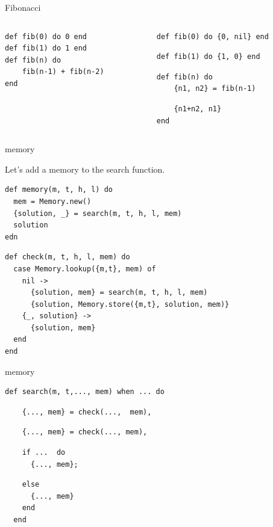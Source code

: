 \begin{frame}[fragile]{Fibonacci}

\begin{columns}
 \begin{column}{0.5\linewidth}
\begin{verbatim}
def fib(0) do 0 end
def fib(1) do 1 end
def fib(n) do
    fib(n-1) + fib(n-2)
end
\end{verbatim}
 \end {column}
\pause
 \begin{column}{0.5\linewidth}
\begin{verbatim}
def fib(0) do {0, nil} end
\end{verbatim}
\pause
\begin{verbatim}
def fib(1) do {1, 0} end
\end{verbatim}
\pause
\begin{verbatim}
def fib(n) do
    {n1, n2} = fib(n-1) 
\end{verbatim}
\pause
\begin{verbatim}
    {n1+n2, n1}
end
\end{verbatim}
 \end {column}
\end{columns}

\end{frame}

\begin{frame}[fragile]{memory}

Let's add a memory to the search function. 

\begin{verbatim}
def memory(m, t, h, l) do
  mem = Memory.new()
  {solution, _} = search(m, t, h, l, mem)
  solution
edn
\end{verbatim}

\begin{verbatim}
def check(m, t, h, l, mem) do
  case Memory.lookup({m,t}, mem) of
    nil ->
      {solution, mem} = search(m, t, h, l, mem)
      {solution, Memory.store({m,t}, solution, mem)}
    {_, solution} -> 
      {solution, mem}
  end
end
\end{verbatim}

\end{frame}


\begin{frame}[fragile]{memory}

\begin{verbatim}
def search(m, t,..., mem) when ... do 
\end{verbatim}
\pause
\begin{verbatim}
    {..., mem} = check(...,  mem), 
\end{verbatim}
\pause
\begin{verbatim}
    {..., mem} = check(..., mem), 
\end{verbatim}
\pause
\begin{verbatim}
    if ...  do
      {..., mem};
\end{verbatim}
\pause
\begin{verbatim}
    else 
      {..., mem}
    end
  end
\end{verbatim}

\end{frame}

